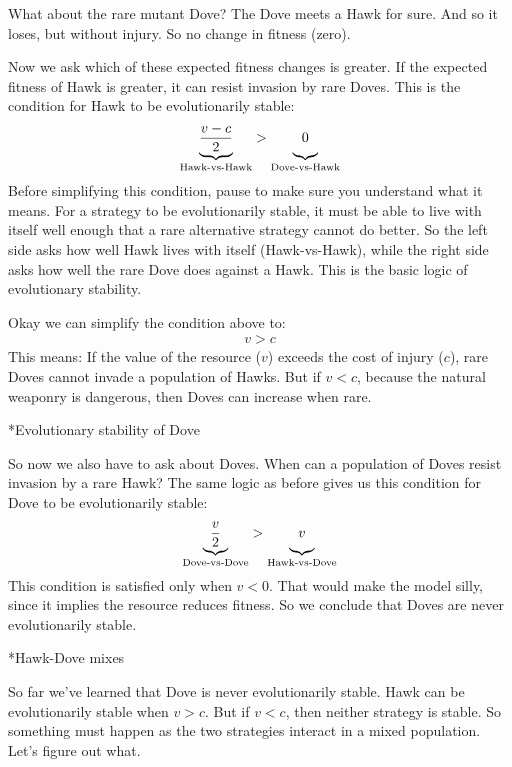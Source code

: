 \documentclass[10pt,reqno]{amsbook}
\makeatletter
\renewcommand\subsection{\@startsection{subsection}{2}
\z@{.5\linespacing\@plus.7\linespacing}{-.5em}%
{\normalfont\normalsize\bfseries}}
\numberwithin{equation}{chapter}
\makeatother
\begin{document}
What about the rare mutant Dove? The Dove meets a Hawk for sure. And so it loses, but without injury. So no change in fitness (zero). 

Now we ask which of these expected fitness changes is greater. If the expected fitness of Hawk is greater, it can resist invasion by rare Doves. This is the condition for Hawk to be evolutionarily stable:
\begin{align*}
	\underbrace{\frac{v-c}{2}}_{\text{Hawk-vs-Hawk}} > \underbrace{0 \vphantom{ \frac{v}{2} }}_{\text{Dove-vs-Hawk}}
\end{align*}
Before simplifying this condition, pause to make sure you understand what it means. For a strategy to be evolutionarily stable, it must be able to live with itself well enough that a rare alternative strategy cannot do better. So the left side asks how well Hawk lives with itself (Hawk-vs-Hawk), while the right side asks how well the rare Dove does against a Hawk. This is the basic logic of evolutionary stability.

Okay we can simplify the condition above to:
\begin{align*}
	v > c
\end{align*}
This means: If the value of the resource ($v$) exceeds the cost of injury ($c$), rare Doves cannot invade a population of Hawks. But if $v < c$, because the natural weaponry is dangerous, then Doves can increase when rare. 

\subsection*{Evolutionary stability of Dove}

So now we also have to ask about Doves. When can a population of Doves resist invasion by a rare Hawk? The same logic as before gives us this condition for Dove to be evolutionarily stable:
\begin{align*}
	\underbrace{\frac{v}{2}}_{\text{Dove-vs-Dove}} > \underbrace{v \vphantom{ \frac{v}{2} }}_{\text{Hawk-vs-Dove}}
\end{align*}
This condition is satisfied only when $v<0$. That would make the model silly, since it implies the resource reduces fitness. So we conclude that Doves are never evolutionarily stable.

\subsection*{Hawk-Dove mixes}

So far we've learned that Dove is never evolutionarily stable. Hawk can be evolutionarily stable when $v>c$. But if $v<c$, then neither strategy is stable. So something must happen as the two strategies interact in a mixed population. Let's figure out what.
\end{document}
